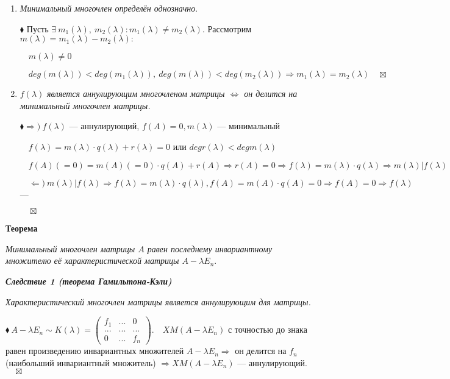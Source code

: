 \documentclass[a4paper, 12pt]{report}
\begin{document}
	\begin{enumerate}
		\item \textit{Минимальный многочлен определён однозначно}.
		
		$\blacklozenge$ Пусть $\exists\ m_1(\lambda),\ m_2(\lambda): m_1(\lambda) \ne m_2(\lambda)$. Рассмотрим $m(\lambda) = m_1(\lambda) - m_2(\lambda) :$ 
		
		$\quad m(\lambda) \ne 0$
		
		$\quad deg (m(\lambda)) < deg (m_1(\lambda)),\ deg (m(\lambda)) < deg (m_2(\lambda)) \Rightarrow m_1(\lambda) = m_2(\lambda) \quad \boxtimes$
		\item $f(\lambda)$ \textit{является аннулирующим многочленом матрицы $\Longleftrightarrow$ он делится на минимальный многочлен матрицы.}
		
		$\blacklozenge \Rightarrow)\ f(\lambda) $ --- аннулирующий, $f(A) = 0, m(\lambda)$ --- минимальный
		
		$\quad f(\lambda) = m(\lambda) \cdot q(\lambda) + r(\lambda) = 0$ или $deg r(\lambda) < deg m(\lambda)$
		
		$\quad f(A) (=0) = m(A) (=0) \cdot q(A) + r(A) \Rightarrow r(A) = 0 \Rightarrow f(\lambda) = m(\lambda) \cdot q(\lambda) \Rightarrow m(\lambda)|f(\lambda)$
		
		$\quad\Leftarrow)\ m(\lambda)|f(\lambda) \Rightarrow f(\lambda) = m(\lambda) \cdot q(\lambda), f(A) = m(A) \cdot q(A) = 0 \Rightarrow f(A) = 0 \Rightarrow f(\lambda)$ --- 
		
		 $\quad \boxtimes$
	\end{enumerate}
	\par
	\textbf{Теорема}
	
	\textit{Минимальный многочлен матрицы $A$ равен последнему инвариантному множителю её характеристической матрицы $A - \lambda E_n$}.
	\par\bigskip
	\textit{\textbf{Следствие 1 (теорема Гамильтона-Кэли)}}
	
	\textit{Характеристический многочлен матрицы является аннулирующим для матрицы.}
	\par\bigskip
	$\blacklozenge\ A - \lambda E_n  \sim K(\lambda) = \begin{pmatrix} f_1 & ... & 0 \\ ... & ... & ... \\ 0 & ... & f_n \end{pmatrix}. \quad XM(A - \lambda E_n)$ с точностью до знака равен произведению инвариантных множителей $A - \lambda E_n \Longrightarrow$ он делится на $f_n$ (наибольший инвариантный множитель) $\Longrightarrow XM(A - \lambda E_n)$ --- аннулирующий. $\quad \boxtimes$
	
\end{document}
